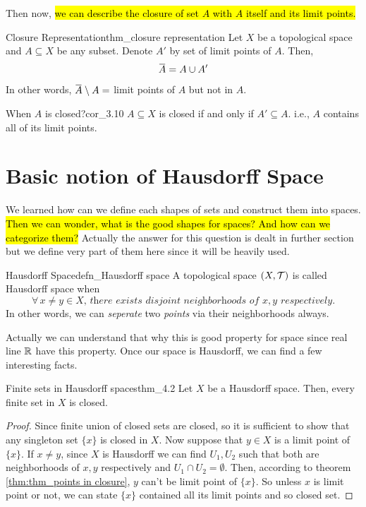 \documentclass[12pt, a4paper, twoside]{article}
\newcommand{\overbar}[1]{\mkern 1.5mu\overline{\mkern-1.5mu#1\mkern-1.5mu}\mkern 1.5mu}
\theoremstyle{plain}
\begin{document}
Then now, \hl{we can describe the closure of set $A$ with $A$ itself and its limit points.}

\begin{thm}{Closure Representation}{thm_closure representation}
    Let $X$ be a topological space and $A \subseteq X$ be any subset. 
    Denote $A'$ by set of limit points of $A$. Then, 
    \[\overbar{A} = A \cup A'\]
    In other words, $\overbar{A} \setminus A = $ limit points of $A$ but not in $A$.
\end{thm}

\begin{cor}{When $A$ is closed?}{cor_3.10}
    $A \subseteq X$ is closed if and only if $A' \subseteq A$. i.e., $A$ contains all of its limit points. 
\end{cor}

\newpage 

\section{Basic notion of Hausdorff Space}

We learned how can we define each shapes of sets and construct them into spaces. 
\hl{Then we can wonder, what is the good shapes for spaces? And how can we categorize them?}
Actually the answer for this question is dealt in further section but we define very part of them here
since it will be heavily used. 

\begin{defn}{Hausdorff Space}{defn_Hausdorff space}
    A topological space $(X, {\mathcal {T}})$ is called Hausdorff space when 
    \[\textit{$\forall \, x \neq y \in X$, there exists disjoint neighborhoods of $x, y$ respectively.}\]
    In other words, we can \textit{seperate} two \textit{points} via their neighborhoods always. 
\end{defn}

Actually we can understand that why this is good property for space since real line ${\mathbb {R}}$ 
have this property. Once our space is Hausdorff, we can find a few interesting facts. 

\begin{thm}{Finite sets in Hausdorff spaces}{thm_4.2}
    Let $X$ be a Hausdorff space. Then, every finite set in $X$ is closed. 
\end{thm}

\begin{proof}
    Since finite union of closed sets are closed, so it is sufficient to show that 
    any singleton set $\{x\}$ is closed in $X$. Now suppose that $y \in X$ is a limit point of $\{x\}$. 
    If $x \neq y$, since $X$ is Hausdorff we can find $U_1, U_2$ such that both are neighborhoods of $x, y$ respectively and $U_1 \cap U_2 = \emptyset$. 
    Then, according to theorem \ref{thm:thm_points in closure},  $y$ can't be limit point of $\{x\}$. 
    So unless $x$ is limit point or not, we can state $\{x\}$ contained all its limit points and so closed set. 
\end{proof}
\end{document}
